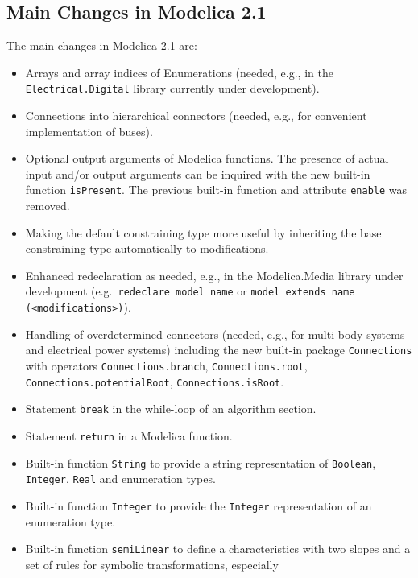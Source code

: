 \subsection{Main Changes in Modelica 2.1}\label{main-changes-in-modelica-2-1}

The main changes in Modelica 2.1 are:
\begin{itemize}
\item
  Arrays and array indices of Enumerations (needed, e.g., in the
  \lstinline!Electrical.Digital! library currently under development).
\item
  Connections into hierarchical connectors (needed, e.g., for convenient
  implementation of buses).
\item
  Optional output arguments of Modelica functions. The presence of
  actual input and/or output arguments can be inquired with the new
  built-in function \lstinline!isPresent!. The previous built-in function and
  attribute \lstinline!enable! was removed.
\item
  Making the default constraining type more useful by inheriting the
  base constraining type automatically to modifications.
\item
  Enhanced redeclaration as needed, e.g., in the Modelica.Media library
  under development (e.g.\ \lstinline!redeclare model name! or \lstinline!model extends name (<modifications>)!).
\item
  Handling of overdetermined connectors (needed, e.g., for multi-body
  systems and electrical power systems) including the new built-in
  package \lstinline!Connections! with operators \lstinline!Connections.branch!,
  \lstinline!Connections.root!, \lstinline!Connections.potentialRoot!, \lstinline!Connections.isRoot!.
\item
  Statement \lstinline!break! in the while-loop of an algorithm section.
\item
  Statement \lstinline!return! in a Modelica function.
\item
  Built-in function \lstinline!String! to provide a string representation of \lstinline!Boolean!, \lstinline!Integer!, \lstinline!Real! and enumeration types.
\item
  Built-in function \lstinline!Integer! to provide the \lstinline!Integer! representation of an enumeration type.
\item
  Built-in function \lstinline!semiLinear! to define a characteristics with two
  slopes and a set of rules for symbolic transformations, especially

\end{itemize}
